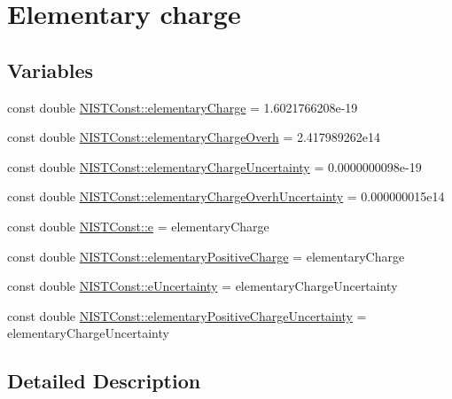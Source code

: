 \hypertarget{group___n_i_s_t_const-_elementary_charge}{}\section{Elementary charge}
\label{group___n_i_s_t_const-_elementary_charge}
\subsection*{Variables}
\begin{DoxyCompactItemize}
\item 
const double \hyperlink{group___n_i_s_t_const-_elementary_charge_gaaa025a77a5281c83628ff8cb46f8038f}{N\+I\+S\+T\+Const\+::elementary\+Charge} = 1.\+6021766208e-\/19
\item 
const double \hyperlink{group___n_i_s_t_const-_elementary_charge_ga262dea92054df909a97626e3c804f1b4}{N\+I\+S\+T\+Const\+::elementary\+Charge\+Overh} = 2.\+417989262e14
\item 
const double \hyperlink{group___n_i_s_t_const-_elementary_charge_ga8e2ed13fe11bd4253e61c6f893a6778d}{N\+I\+S\+T\+Const\+::elementary\+Charge\+Uncertainty} = 0.\+0000000098e-\/19
\item 
const double \hyperlink{group___n_i_s_t_const-_elementary_charge_gadc450d412ab46877fee4e29d8ccf7ce3}{N\+I\+S\+T\+Const\+::elementary\+Charge\+Overh\+Uncertainty} = 0.\+000000015e14
\item 
const double \hyperlink{group___n_i_s_t_const-_elementary_charge_gad3e7e33fe20772dfbc4b39e433eb2f3a}{N\+I\+S\+T\+Const\+::e} = elementary\+Charge
\item 
const double \hyperlink{group___n_i_s_t_const-_elementary_charge_ga1177663318bfe8bfa4b0c4fa489fbfb2}{N\+I\+S\+T\+Const\+::elementary\+Positive\+Charge} = elementary\+Charge
\item 
const double \hyperlink{group___n_i_s_t_const-_elementary_charge_ga2c92e71a42a5f0e7facd87c2c15c0f2b}{N\+I\+S\+T\+Const\+::e\+Uncertainty} = elementary\+Charge\+Uncertainty
\item 
const double \hyperlink{group___n_i_s_t_const-_elementary_charge_gab7ff4a358af518837d1e8f6fd6b26360}{N\+I\+S\+T\+Const\+::elementary\+Positive\+Charge\+Uncertainty} = elementary\+Charge\+Uncertainty
\end{DoxyCompactItemize}


\subsection{Detailed Description}


